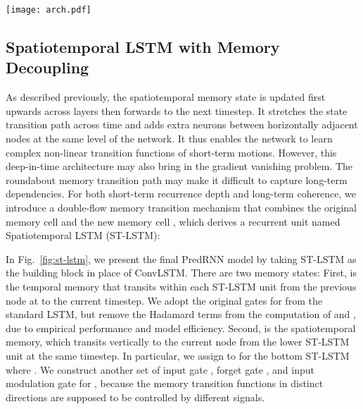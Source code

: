 \documentclass[10pt,journal,compsoc]{IEEEtran}
\newcommand{\fig}[1]{Fig.~\ref{#1}}
\begin{document}
\begin{figure*}[t]
  \centering
  \texttt{[image: arch.pdf]}
  \vskip -0.1in
  \caption{\textbf{Left:} the main architecture of PredRNN, in which the orange arrows denote the state transition paths of , namely the spatiotemporal memory flow.
\textbf{Right:} the ST-LSTM unit with twisted memory states that serves as the building block of the proposed PredRNN, where the orange circles denote the unique structures compared with ConvLSTM.
  }
  \label{fig:st-lstm}
  \vspace{-10pt}
\end{figure*}

\subsection{Spatiotemporal LSTM with Memory Decoupling}


As described previously, the spatiotemporal memory state is updated first upwards across layers then forwards to the next timestep.
It stretches the state transition path across time and adds extra neurons between horizontally adjacent nodes at the same level of the network. It thus enables the network to learn complex non-linear transition functions of short-term motions.
However, this deep-in-time architecture may also bring in the gradient vanishing problem. The roundabout memory transition path may make it difficult to capture long-term dependencies. 
For both short-term recurrence depth and long-term coherence, we introduce a double-flow memory transition mechanism that combines the original memory cell  and the new memory cell , which derives a recurrent unit named Spatiotemporal LSTM (ST-LSTM): 


In \fig{fig:st-lstm}, we present the final PredRNN model by taking ST-LSTM as the building block in place of ConvLSTM. 
There are two memory states: First,  is the temporal memory that transits within each ST-LSTM unit from the previous node at  to the current timestep. 
We adopt the original gates for  from the standard LSTM, but remove the Hadamard terms  from the computation of  and , due to empirical performance and model efficiency.
Second,  is the spatiotemporal memory, which transits vertically to the current node from the lower  ST-LSTM unit at the same timestep. 
In particular, we assign  to  for the bottom ST-LSTM where . 
We construct another set of input gate , forget gate , and input modulation gate  for , because the memory transition functions in distinct directions are supposed to be controlled by different signals.
\end{document}
